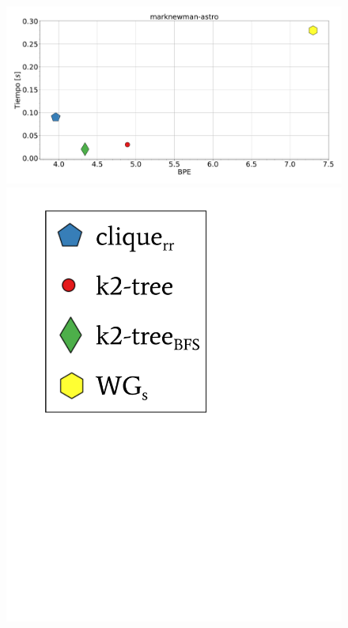 \begin{figure}
    	\centering
    	\begin{minipage}{1\textwidth}
    			\centering
    			\begin{minipage}{0.8\textwidth}
    				\centering
    				\includegraphics[width=1\linewidth]{img/bpeTimes/secuencial/marknewman-astro.pdf}
    			\end{minipage}
    			\begin{minipage}{0.15\textwidth}
    				\centering
    				\includegraphics[scale=.24, clip, trim=70 320 230 30]{img/bpeTimes/labelSec.pdf}
    			\end{minipage}
    			

\end{minipage}
\end{figure}
